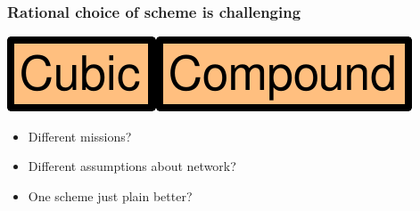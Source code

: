 \documentclass[svgnames]{beamer}
\newcommand{\ssline}{\vspace{8 pt}}
\begin{document}

\begin{frame}
\frametitle{Rational choice of scheme is challenging}

\begin{centering}
\includegraphics[height=20 pt]{cubic.pdf}\hspace{8 pt}{\bf vs.}\hspace{8 pt}\includegraphics[height=20 pt]{compound.pdf}

\end{centering}

\ssline
\ssline
\ssline

\begin{itemize}

\Large

\item Different missions?

\item Different assumptions about network?

\item One scheme just plain better?

\end{itemize}

\end{frame}
\end{document}
